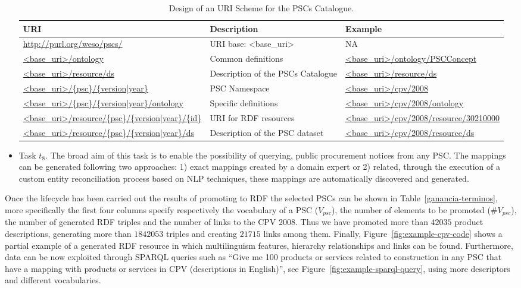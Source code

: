 \begin{itemize}
 \begin{table}[!ht]
\renewcommand{\arraystretch}{1.3}
\begin{center}
\begin{tabular}[c]{|p{5cm}|p{4.5cm}|p{5cm}|} 
\hline
  \textbf{URI} &  \textbf{Description} & \textbf{Example} \\\hline
  \url{http://purl.org/weso/pscs/} & URI base: <base\_uri> & NA \\ \hline
  \url{<base_uri>/ontology} & Common definitions & \url{<base_uri>/ontology/PSCConcept} \\ \hline
  \url{<base_uri>/resource/ds} & Description of the PSCs Catalogue & \url{<base_uri>/resource/ds} \\ \hline
  \url{<base_uri>/{psc}/{version|year}} & PSC Namespace & \url{<base_uri>/cpv/2008} \\ \hline
  \url{<base_uri>/{psc}/{version|year}/ontology} & Specific definitions & \url{<base_uri>/cpv/2008/ontology} \\ \hline
  \url{<base_uri>/resource/{psc}/{version|year}/{id}} & URI for RDF resources & \url{<base_uri>/cpv/2008/resource/30210000} \\ \hline
  \url{<base_uri>/resource/{psc}/{version|year}/ds} & Description of the PSC dataset  & \url{<base_uri>/cpv/2008/resource/ds} \\ \hline
\hline
\end{tabular}
\caption{Design of an URI Scheme for the PSCs Catalogue.}\label{table:pscs-uri}
  \end{center}
\end{table} 

\item Task $t_8$. The broad aim of this task is to enable the possibility of querying, 
public procurement notices from any PSC. The mappings can be generated following two approaches: 
1) exact mappings created by a domain expert or 2) related, through the execution of a custom entity reconciliation process 
based on NLP techniques, these mappings are automatically discovered and generated.
\end{itemize}

Once the lifecycle has been carried out the results of promoting to RDF the selected PSCs can be shown in Table~\ref{ganancia-terminos},
more specifically the first four columns specify respectively the vocabulary of a PSC ($V_{psc}$), the number of elements 
to be promoted (\#$V_{psc}$), the number of generated RDF triples and the number of links to the CPV 2008. 
Thus we have promoted more than $42035$ product descriptions, generating more than $1842053$ triples and creating $21715$ 
links among them. Finally, Figure~\ref{fig:example-cpv-code} shows a partial example of a generated RDF resource in which multilinguism features, 
hierarchy relationships and links can be found. Furthermore, data can be now exploited through SPARQL queries 
such as ``Give me 100 products or services related to construction in any PSC that have a mapping with products or 
services in CPV (descriptions in English)'', see Figure~\ref{fig:example-sparql-query}, using more descriptors and 
different vocabularies.

